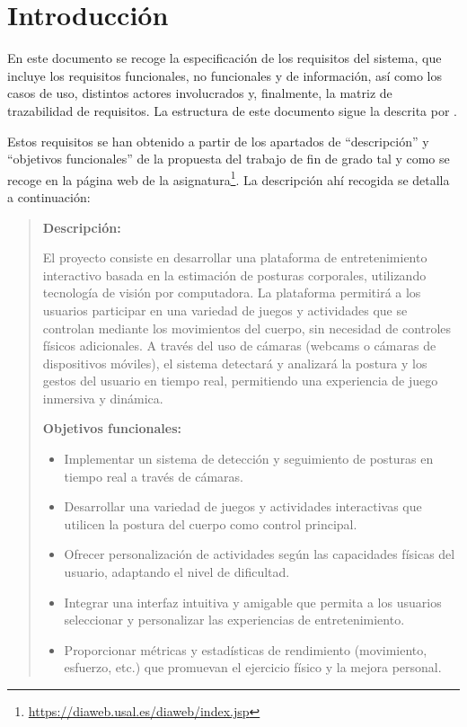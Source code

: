 \chapter{Introducción}
\label{anexo1:cap:introduccion}
En este documento se recoge la especificación de los requisitos del sistema, que incluye los
requisitos funcionales, no funcionales y de información, así como los casos de uso, distintos
actores involucrados y, finalmente, la matriz de trazabilidad de requisitos. La estructura de
este documento sigue la descrita por .

Estos requisitos se han obtenido a partir de los apartados de \enquote{descripción} y
\enquote{objetivos funcionales} de la propuesta del trabajo de fin de grado tal y como se recoge
en la página web de la asignatura\footnote{\url{https://diaweb.usal.es/diaweb/index.jsp}}. La
descripción ahí recogida se detalla a continuación:
\begin{quote}
      \textbf{Descripción:}

      El proyecto consiste en desarrollar una plataforma de entretenimiento interactivo basada en la
      estimación de posturas corporales, utilizando tecnología de visión por computadora. La
      plataforma permitirá a los usuarios participar en una variedad de juegos y actividades que se
      controlan mediante los movimientos del cuerpo, sin necesidad de controles físicos adicionales.
      A través del uso de cámaras (webcams o cámaras de dispositivos móviles), el sistema detectará
      y analizará la postura y los gestos del usuario en tiempo real, permitiendo una experiencia de
      juego inmersiva y dinámica.

      \textbf{Objetivos funcionales:}

      \begin{itemize}
            \item Implementar un sistema de detección y seguimiento de posturas en tiempo real a través
                  de cámaras.
            \item Desarrollar una variedad de juegos y actividades interactivas que utilicen la postura
                  del cuerpo como control principal.
            \item Ofrecer personalización de actividades según las capacidades físicas del usuario,
                  adaptando el nivel de dificultad.
            \item Integrar una interfaz intuitiva y amigable que permita a los usuarios seleccionar y
                  personalizar las experiencias de entretenimiento.
            \item Proporcionar métricas y estadísticas de rendimiento (movimiento, esfuerzo, etc.) que
                  promuevan el ejercicio físico y la mejora personal.
      \end{itemize}
\end{quote}


